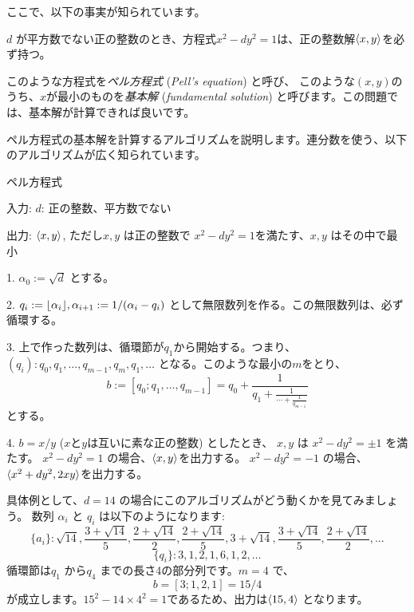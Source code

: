 \documentclass{jsarticle}
\begin{document}
 ここで、以下の事実が知られています。
 \begin{theorem}
  \label{thm:pells-equation-has-solutions}
  $d$ が平方数でない正の整数のとき、方程式$x^2 - dy^2=1$は、正の整数解$\langle{x, y}\rangle$を必ず持つ。
 \end{theorem}
 このような方程式を\emph{ペル方程式} (\emph{Pell's equation}) と呼び、
 このような$(x,y)$のうち、$x$が最小のものを\emph{基本解} (\emph{fundamental solution}) と呼びます。この問題では、基本解が計算できれば良いです。

 ペル方程式の基本解を計算するアルゴリズムを説明します。連分数を使う、以下のアルゴリズムが広く知られています。

 \begin{algorithm}                      
  \caption{ペル方程式}
  \label{alg:pells-equation}
  入力: $d$: 正の整数、平方数でない

  出力: $\langle{x, y}\rangle$, ただし$x, y$ は正の整数で $x^2 - dy^2 = 1$を満たす、$x,y$ はその中で最小

  1. $\alpha_0 := \sqrt{d}$ とする。

  2. $q_i := \lfloor{\alpha_i}\rfloor, \alpha_{i+1} := 1/(\alpha_i - q_i)$ として無限数列を作る。この無限数列は、必ず循環する。

  3. 上で作った数列は、循環節が$q_1$から開始する。つまり、$(q_i) \colon q_0, q_1,\ldots, q_{m-1}, q_m, q_{1}, \ldots$ となる。このような最小の$m$をとり、
  \begin{displaymath}
   b := [q_0; q_1, \ldots, q_{m-1}] = q_0 + \frac{1}{q_1 + \frac{1}{\cdots + \frac{1}{q_{m-1}}}}
  \end{displaymath}
  とする。

  4. $b = x/y$ ($x$と$y$は互いに素な正の整数) としたとき、
  $x, y$ は $x^2 -dy^2 = \pm 1$ を満たす。
  $x^2 - dy^2 = 1$ の場合、$\langle{x, y}\rangle$を出力する。
  $x^2 - dy^2 = -1$ の場合、$\langle{x^2 + dy^2, 2xy}\rangle$を出力する。
 \end{algorithm}
 具体例として、$d = 14$ の場合にこのアルゴリズムがどう動くかを見てみましょう。
 数列 $\alpha_i$ と $q_i$ は以下のようになります:
 \begin{displaymath}
  \{a_i\}: \sqrt{14},
  \frac{3+\sqrt{14}}{5}, \frac{2+\sqrt{14}}{2},
  \frac{2+\sqrt{14}}{5}, 3+\sqrt{14},
  \frac{3+\sqrt{14}}{5}, \frac{2+\sqrt{14}}{2}, \ldots
 \end{displaymath}
 \begin{displaymath}
  \{q_i\}: 3, 1, 2, 1, 6, 1, 2, \ldots
 \end{displaymath}
 循環節は$q_1$ から$q_4$ までの長さ4の部分列です。$m = 4$ で、
 \begin{displaymath}
  b = [3; 1, 2, 1] = 15/4
 \end{displaymath}
 が成立します。$15^2 - 14 \times 4^2 = 1$であるため、出力は$\langle{15, 4}\rangle$ となります。
\end{document}
